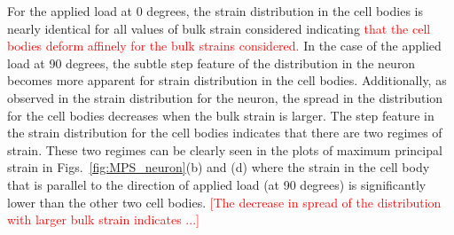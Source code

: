 \documentclass[10pt]{asme2ej}
\begin{document}
%
For the applied load at 0 degrees, the strain distribution in the cell bodies is nearly identical for all values of bulk strain considered indicating \textcolor{red}{that the cell bodies deform affinely for the bulk strains considered.} In the case of the applied load at 90 degrees, the subtle step feature of the distribution in the neuron becomes more apparent for strain distribution in the cell bodies. Additionally, as observed in the strain distribution for the neuron, the spread in the distribution for the cell bodies decreases when the bulk strain is larger. The step feature in the strain distribution for the cell bodies indicates that there are two regimes of strain. These two regimes can be clearly seen in the plots of maximum principal strain in Figs.\ \ref{fig:MPS_neuron}(b) and (d) where the strain in the cell body that is parallel to the direction of applied load (at 90 degrees) is significantly lower than the other two cell bodies. \textcolor{red}{[The decrease in spread of the distribution with larger bulk strain indicates ...]}
%
\end{document}
